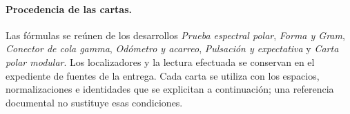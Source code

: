 \paragraph{Procedencia de las cartas.}
Las fórmulas se reúnen de los desarrollos \emph{Prueba espectral polar},
\emph{Forma y Gram}, \emph{Conector de cola gamma}, \emph{Odómetro y
acarreo}, \emph{Pulsación y expectativa} y \emph{Carta polar modular}.
Los localizadores y la lectura efectuada se conservan en el expediente de
fuentes de la entrega. Cada carta se utiliza con los espacios,
normalizaciones e identidades que se explicitan a continuación; una
referencia documental no sustituye esas condiciones.

